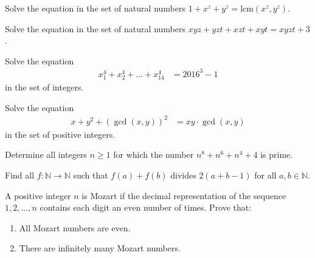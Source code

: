 \documentclass[problems.tex]{subfile}
\begin{document}
	\begin{problem}
		Solve the equation in the set of natural numbers $1+x^z + y^z = \text{lcm}(x^z,y^z)$. %
	\end{problem}

	\begin{problem}
		Solve the equation in the set of natural numbers $xyz+yzt+xzt+xyt = xyzt + 3$. %
	\end{problem}

	\begin{problem}
		Solve the equation
		\begin{align*}
			x_1^4 + x_2^4 + \dots + x_{14}^4 &= 2016^3 -1
		\end{align*}
		in the set of integers.
	\end{problem}

	\begin{problem}
		Solve the equation
		\begin{align*}
			x + y^2 + \left(\gcd(x,y)\right)^2 &= xy \cdot \gcd(x,y)
		\end{align*}
		in the set of positive integers.
	\end{problem}

	\begin{problem}
		Determine all integers $n\ge1$ for which the number $n^8+n^6+n^4+4$ is prime. %
	\end{problem}

	\begin{problem}
		Find all $f : \mathbb{N} \to \mathbb{N} $ such that $f(a) + f(b)$ divides $2(a + b - 1)$ for all $a, b \in \mathbb{N}$. %
	\end{problem}

	\begin{problem}
		A positive integer $n$ is Mozart if the decimal representation of the sequence $1, 2, \ldots, n$ contains each digit an even number of times.
		Prove that:
		\begin{enumerate}
			\item All Mozart numbers are even.
			\item There are infinitely many Mozart numbers.
		\end{enumerate}
	\end{problem}
\end{document}
